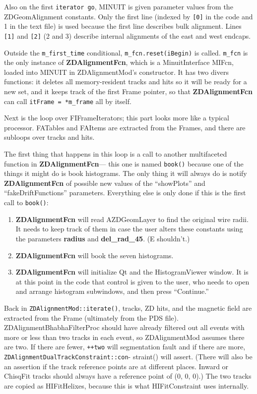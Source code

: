 \documentclass[12pt]{article}
\begin{document}
Also on the first {\tt iterator go}, MINUIT is given parameter values
from the ZDGeomAlignment constants.  Only the first line (indexed by
{\tt [0]} in the code and 1 in the text file) is used because the
first line describes bulk alignment.  Lines {\tt [1]} and {\tt [2]} (2
and 3) describe internal alignments of the east and west endcaps.

Outside the {\tt m\_first\_time} conditional, {\tt m\_fcn.reset(iBegin)}
is called.  {\tt m\_fcn} is the only instance of {\bf ZDAlignmentFcn},
which is a MinuitInterface MIFcn, loaded into MINUIT in
ZDAlignmentMod's constructor.  It has two divers functions: it deletes
all memory-resident tracks and hits so it will be ready for a new set,
and it keeps track of the first Frame pointer, so that
{\bf ZDAlignmentFcn} can call {\tt itFrame = *m\_frame} all by itself.

Next is the loop over FIFrameIterators; this part looks more like a
typical processor.  FATables and FAItems are extracted from the
Frames, and there are subloops over tracks and hits.

The first thing that happens in this loop is a call to another
multifaceted function in {\bf ZDAlignmentFcn}--- this one is named
{\tt book()} because one of the things it might do is book histograms.
The only thing it will always do is notify {\bf ZDAlignmentFcn} of
possible new values of the ``showPlots'' and ``fakeDriftFunctions''
parameters.  Everything else is only done if this is the first call to
{\tt book()}:
\begin{enumerate}

  \item {\bf ZDAlignmentFcn} will read AZDGeomLayer to find the
  original wire radii.  It needs to keep track of them in case the
  user alters these constants using the parameters {\bf radius} and
  {\bf del\_rad\_45}.  (E shouldn't.)

  \item {\bf ZDAlignmentFcn} will book the seven histograms.

  \item {\bf ZDAlignmentFcn} will initialize Qt and the
  HistogramViewer window.  It is at this point in the code that
  control is given to the user, who needs to open and arrange
  histogram subwindows, and then press ``Continue.''

\end{enumerate}

Back in {\tt ZDAlignmentMod::iterate()}, tracks, ZD hits, and the
magnetic field are extracted from the Frame (ultimately from the PDS
file).  ZDAlignmentBhabhaFilterProc should have already filtered out
all events with more or less than two tracks in each event, so
ZDAlignmentMod assumes there are two.  If there are fewer,
{\tt ++two} will segmentation fault and if there are more,
{\tt ZDAlignmentDualTrackConstraint::con}- {straint()} will assert.
(There will also be an assertion if the track reference points are at
different places.  Inward or ChisqFit tracks should always have a
reference point of (0, 0, 0).)  The two tracks are copied as
HIFitHelixes, because this is what HIFitConstraint uses internally.
\end{document}
